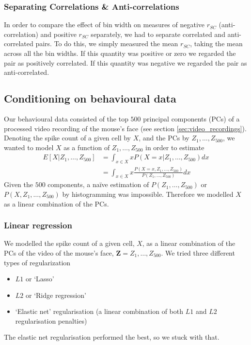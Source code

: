         \subsubsection{Separating Correlations \& Anti-correlations}\label{sec:corr_anti_corr}
        In order to compare the effect of bin width on measures of negative $r_{SC}$ (anti-correlation) and positive $r_{SC}$ separately, we had to separate correlated and anti-correlated pairs. To do this, we simply measured the mean $r_{SC}$, taking the mean across all the bin widths. If this quantity was positive or zero we regarded the pair as positively correlated. If this quantity was negative we regarded the pair as anti-correlated.

    \subsection{Conditioning on behavioural data}\label{sec:conditioning_on_behavioural_data}
    Our behavioural data consisted of the top $500$ principal components (PCs) of a processed video recording of the mouse's face (see section \ref{sec:video_recordings}). Denoting the spike count of a given cell by $X$, and the PCs by $Z_1,\dots,Z_{500}$, we wanted to model $X$ as a function of $Z_1,\dots,Z_{500}$ in order to estimate
    \begin{align}
      E[X|Z_1,\dots,Z_{500}] &= \int_{x \in X} x P(X=x | Z_1,\dots,Z_{500}) dx \\
        &= \int_{x \in X} x \frac{P(X=x, Z_1,\dots,Z_{500})}{P(Z_1,\dots,Z_{500})} dx
    \end{align}
    Given the $500$ components, a na\"{i}ve estimation of $P(Z_1,\dots,Z_{500})$ or $P(X, Z_1,\dots,Z_{500})$ by histogramming was impossible. Therefore we modelled $X$ as a linear combination of the PCs.

        \subsubsection{Linear regression}
        We modelled the spike count of a given cell, $X$, as a linear combination of the PCs of the video of the mouse's face, $\mathbf{Z} = Z_1,\dots,Z_{500}$. We tried three different types of regularization
        \begin{itemize}
            \item $L1$ or `Lasso'
            \item $L2$ or `Ridge regression'
            \item `Elastic net' regularisation (a linear combination of both $L1$ and $L2$ regularisation penalties)
        \end{itemize}
        The elastic net regularisation performed the best, so we stuck with that.

